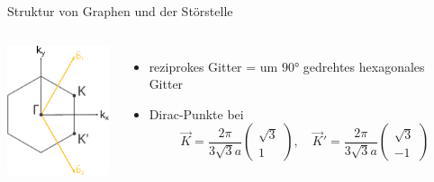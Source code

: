 \documentclass[aspectratio=1610, 9pt, xcolor=dvipsnames]{beamer}
\begin{document}
\begin{frame}{Struktur von Graphen und der Störstelle}
\begin{columns}
    \vspace*{1cm}
    \centering
    \includegraphics[width=3cm]{Plots/graphene_first_brillouine_zone.pdf}
    \vspace*{-0.2cm}
    \begin{itemize}
      \item reziprokes Gitter = um $90°$ gedrehtes hexagonales Gitter 
      \item Dirac-Punkte bei
    \begin{equation*}
      \vec{K}  = \frac{2\pi}{3\sqrt{3}a} \begin{pmatrix}  \sqrt{3}\\[4pt]  1   \end{pmatrix}, \quad
      \vec{K}' = \frac{2\pi}{3\sqrt{3}a} \begin{pmatrix}  \sqrt{3}\\[4pt]  -1  \end{pmatrix} 
    \end{equation*}
  \end{itemize}
\end{columns} 
\end{frame}
\end{document}
